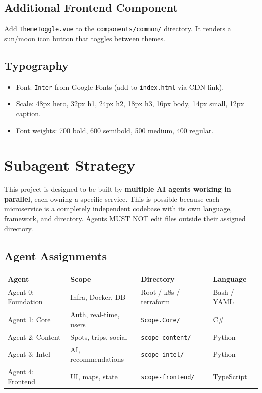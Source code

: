 \documentclass[12pt,letterpaper]{article}
\begin{document}
\subsection{Additional Frontend Component}
Add \texttt{ThemeToggle.vue} to the \texttt{components/common/} directory. It renders a sun/moon icon button that toggles between themes.

\subsection{Typography}
\begin{itemize}
  \item Font: \texttt{Inter} from Google Fonts (add to \texttt{index.html} via CDN link).
  \item Scale: 48px hero, 32px h1, 24px h2, 18px h3, 16px body, 14px small, 12px caption.
  \item Font weights: 700 bold, 600 semibold, 500 medium, 400 regular.
\end{itemize}

\newpage

\section{Subagent Strategy}

This project is designed to be built by \textbf{multiple AI agents working in parallel}, each owning a specific service. This is possible because each microservice is a completely independent codebase with its own language, framework, and directory. Agents MUST NOT edit files outside their assigned directory.

\subsection{Agent Assignments}

\begin{tabular}{|l|l|l|l|}
\hline
\textbf{Agent} & \textbf{Scope} & \textbf{Directory} & \textbf{Language} \\
\hline
Agent 0: Foundation & Infra, Docker, DB & Root / k8s / terraform & Bash / YAML \\
Agent 1: Core & Auth, real-time, users & \texttt{Scope.Core/} & C\# \\
Agent 2: Content & Spots, trips, social & \texttt{scope\_content/} & Python \\
Agent 3: Intel & AI, recommendations & \texttt{scope\_intel/} & Python \\
Agent 4: Frontend & UI, maps, state & \texttt{scope-frontend/} & TypeScript \\
\hline
\end{tabular}
\end{document}
